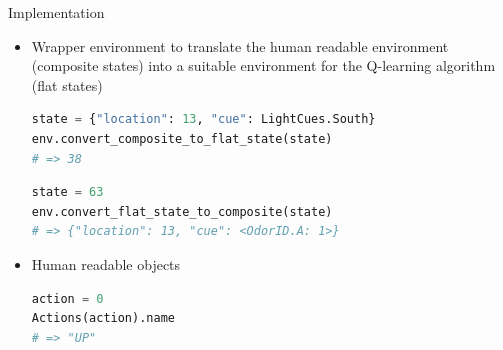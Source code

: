 \documentclass[bigger]{beamer}
\begin{document}
\begin{frame}[<+->][label={sec:orgf3b191f},fragile]{Implementation}
\begin{itemize}
\item Wrapper environment to translate the human readable environment (\alert{composite states}) into a suitable environment for the Q-learning algorithm (\alert{flat states})
\scriptsize
\begin{lstlisting}[language={Python}]
state = {"location": 13, "cue": LightCues.South}
env.convert_composite_to_flat_state(state)
# => 38
\end{lstlisting}
\begin{lstlisting}[language={Python}]
state = 63
env.convert_flat_state_to_composite(state)
# => {"location": 13, "cue": <OdorID.A: 1>}
\end{lstlisting}
\item Human readable objects
\scriptsize
\begin{lstlisting}[language={Python}]
action = 0
Actions(action).name
# => "UP"
\end{lstlisting}
\end{itemize}
\end{frame}
\end{document}
